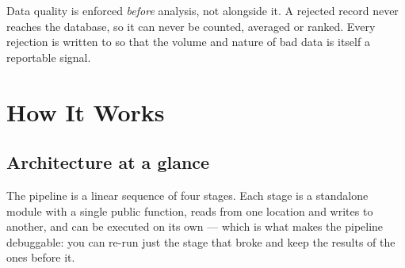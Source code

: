 \begin{keybox}
Data quality is enforced \emph{before} analysis, not alongside it. A rejected
record never reaches the database, so it can never be counted, averaged or
ranked. Every rejection is written to
 so that the volume and nature of
bad data is itself a reportable signal.
\end{keybox}

\section{How It Works}

\subsection{Architecture at a glance}

The pipeline is a linear sequence of four stages. Each stage is a standalone
module with a single public function, reads from one location and writes to
another, and can be executed on its own --- which is what makes the pipeline
debuggable: you can re-run just the stage that broke and keep the results of
the ones before it.

